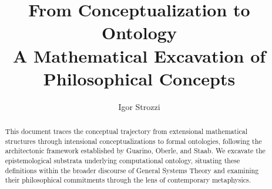 \documentclass[12pt,a4paper]{article}
\title{From Conceptualization to Ontology\\
	\large{A Mathematical Excavation of Philosophical Concepts}}
\author[]{Igor Strozzi}
\affil[]{\itshape \small Applied Mathematics Department \\ Federal University of Rio de Janeiro}
\date{}
\begin{document}
	
	\maketitle
	
	\begin{abstract}
		This document traces the conceptual trajectory from extensional mathematical structures through intensional conceptualizations to formal ontologies, following the architectonic framework established by Guarino, Oberle, and Staab. We excavate the epistemological substrata underlying computational ontology, situating these definitions within the broader discourse of General Systems Theory and examining their philosophical commitments through the lens of contemporary metaphysics.
	\end{abstract}
	
	\newpage
	\tableofcontents
	\newpage
	
	
	
	
	
	
	
	
	
	
	
\end{document}
